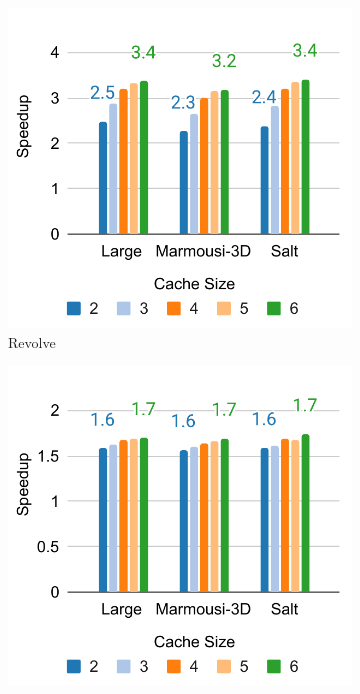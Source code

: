 \documentclass[Ingles]{ic-tese-v3}
\begin{document}
\begin{figure}[h!]
    \centering

    \begin{subfigure}[b]{0.33\textwidth}
        \includegraphics[width=\textwidth]{figures/prefetch_speedup/prefetch_speedup_revolve.pdf}
        \caption{Revolve}
        \label{fig:prefetch_speedup_revolve}
    \end{subfigure}
    \hfill
    \begin{subfigure}[b]{0.33\textwidth}
        \includegraphics[width=\textwidth]{figures/prefetch_speedup/prefetch_speedup_zcut.pdf}

\end{subfigure}
\end{figure}
\end{document}
